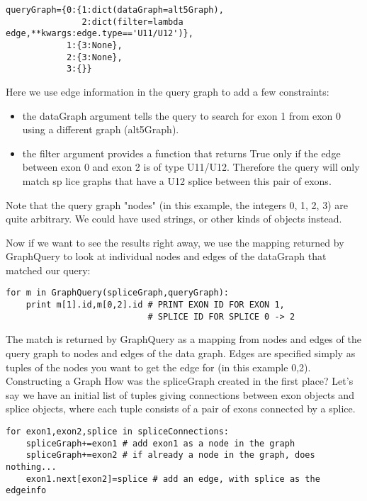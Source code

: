 \documentclass{howto}
\begin{document}
\begin{verbatim}
queryGraph={0:{1:dict(dataGraph=alt5Graph),
               2:dict(filter=lambda edge,**kwargs:edge.type=='U11/U12')},
            1:{3:None},
            2:{3:None},
            3:{}}
\end{verbatim}

Here we use edge information in the query graph to add a few constraints:

\begin{itemize}
\item
the dataGraph argument tells the query to search for exon 1 from exon 0 using a different graph (alt5Graph).

\item    
the filter argument provides a function that returns True only if the edge between exon 0 and exon 2 is of type U11/U12.  Therefore the query will only match sp
lice graphs that have a U12 splice between this pair of exons.

\end{itemize}

Note that the query graph "nodes" (in this example, the integers 0, 1, 2, 3) are
quite arbitrary.  We could have used strings, or other kinds of objects instead.

Now if we want to see the results right away, we use the mapping returned by GraphQuery to look at individual nodes and edges of the dataGraph that matched our query:

\begin{verbatim}
for m in GraphQuery(spliceGraph,queryGraph):
    print m[1].id,m[0,2].id # PRINT EXON ID FOR EXON 1,
                            # SPLICE ID FOR SPLICE 0 -> 2
\end{verbatim}

The match is returned by GraphQuery as a mapping from nodes and edges of the query graph to nodes and edges of the data graph.  Edges are specified simply as tuples of the nodes you want to get the edge for (in this example 0,2).
Constructing a Graph
How was the spliceGraph created in the first place?  Let's say we have an initial list of tuples giving connections between exon objects and splice objects, where each tuple consists of a pair of exons connected by a splice.

\begin{verbatim}
for exon1,exon2,splice in spliceConnections: 
    spliceGraph+=exon1 # add exon1 as a node in the graph
    spliceGraph+=exon2 # if already a node in the graph, does nothing...
    exon1.next[exon2]=splice # add an edge, with splice as the edgeinfo
\end{verbatim}
\end{document}
